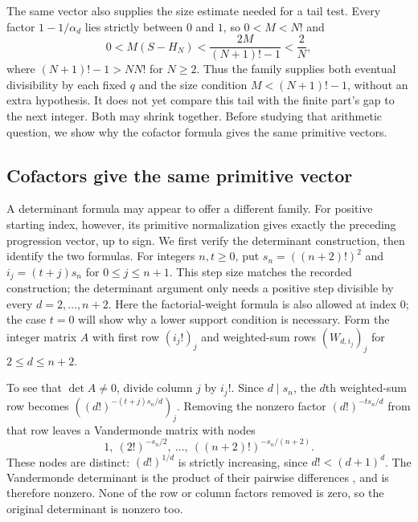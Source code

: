 \documentclass[11pt]{article}
\begin{document}
The same vector also supplies the size estimate needed for a tail test.
Every factor $1-1/\alpha_d$ lies strictly between $0$ and $1$, so
$0<M<N!$ and
\[
 0<M(S-H_N)<\frac{2M}{(N+1)!-1}<\frac2N,
\]
where $(N+1)!-1>NN!$ for $N\ge2$. Thus the family supplies both
eventual divisibility by each fixed $q$ and the size condition
$M<(N+1)!-1$, without an extra hypothesis. It does not yet compare
this tail with the finite part's gap to the next integer. Both may
shrink together. Before studying that arithmetic question, we show why
the cofactor formula gives the same primitive vectors.

\subsection{Cofactors give the same primitive vector}\label{long68:sec:cofactor-progression}
A determinant formula may appear to offer a different family. For
positive starting index, however, its primitive normalization gives
exactly the preceding progression vector, up to sign. We first verify
the determinant construction, then identify the two formulas. For
integers $n,t\ge0$, put
$s_n=((n+2)!)^2$ and $i_j=(t+j)s_n$ for $0\le j\le n+1$.
This step size matches the recorded construction; the determinant argument
only needs a positive step divisible by every $d=2,\ldots,n+2$.
Here the factorial-weight formula is also allowed at index $0$; the case
$t=0$ will show why a lower support condition is necessary. Form the
integer matrix $A$ with first row $(i_j!)_j$ and weighted-sum rows
$(W_{d,i_j})_j$ for $2\le d\le n+2$.

To see that $\det A\ne0$, divide column $j$ by $i_j!$.
Since $d\mid s_n$, the $d$th weighted-sum row becomes
$((d!)^{-(t+j)s_n/d})_j$. Removing the nonzero factor
$(d!)^{-t s_n/d}$ from that row leaves a Vandermonde matrix with nodes
\[
1,\ (2!)^{-s_n/2},\ \ldots,\ ((n+2)!)^{-s_n/(n+2)}.
\]
These nodes are distinct: $(d!)^{1/d}$ is strictly increasing, since
$d!<(d+1)^d$. The Vandermonde determinant is the product of their
pairwise differences \cite[(1.3.13)]{nist-vandermonde}, and is therefore nonzero. None of the row or
column factors removed is zero, so the original determinant is nonzero
too.
\end{document}
